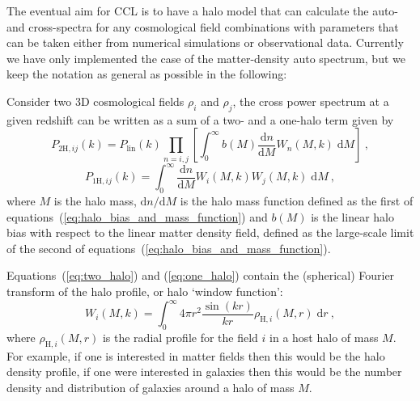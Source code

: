 \documentclass[\docopts]{\docclass}
\begin{document}
The eventual aim for CCL is to have a halo model that can calculate the auto-
and cross-spectra for any cosmological field combinations with parameters that
can be taken either from numerical simulations or observational data. Currently
we have only implemented the case of the matter-density auto spectrum, but we
keep the notation as general as possible in the following:

Consider two 3D cosmological fields $\rho_i$ and $\rho_j$, the cross power
spectrum at a given redshift can be written as a sum of a two- and a one-halo
term given by
\begin{equation}
P_{2\mathrm{H},ij}(k)=P_{\mathrm{lin}}(k)
\prod_{n=i,j}\left[\int_0^\infty b(M)\frac{\mathrm{d}n}{\mathrm{d}M}W_n(M,k)\;\mathrm{d}M\right]\ ,
\label{eq:two_halo}
\end{equation}
\begin{equation}
P_{1\mathrm{H},ij}(k)=\int_0^\infty \frac{\mathrm{d}n}{\mathrm{d}M}W_i(M,k)W_j(M,k)\;\mathrm{d}M\ ,
\label{eq:one_halo}
\end{equation}
where $M$ is the halo mass, $\mathrm{d}n/\mathrm{d}M$ is the halo mass function
defined as the first of equations~(\ref{eq:halo_bias_and_mass_function}) and
$b(M)$ is the linear halo bias with respect to the linear matter density field,
defined as the large-scale limit of the second of
equations~(\ref{eq:halo_bias_and_mass_function}).

Equations~(\ref{eq:two_halo}) and (\ref{eq:one_halo}) contain the (spherical)
Fourier transform of the halo profile, or halo `window function':
\begin{equation}
W_i(M,k)=\int_0^\infty4\pi r^2\frac{\sin(kr)}{kr}\rho_{\mathrm{H},i}(M,r)\;\mathrm{d}r\ ,
\label{eq:window_function}
\end{equation}
where $\rho_{\mathrm{H},i}(M,r)$ is the radial profile for the field $i$ in a
host halo of mass $M$. For example, if one is interested in matter fields then
this would be the halo density profile, if one were interested in galaxies then
this would be the number density and distribution of galaxies around a halo of
mass $M$.
\end{document}

